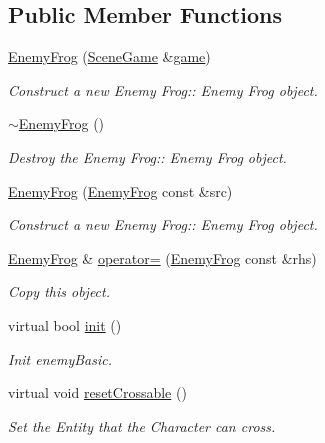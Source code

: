 \subsection*{Public Member Functions}
\begin{DoxyCompactItemize}
\item 
\hyperlink{class_enemy_frog_a2aaa60ad2669d8957e2569aa771c8714}{Enemy\+Frog} (\hyperlink{class_scene_game}{Scene\+Game} \&\hyperlink{class_a_entity_aa2c05db944a8b7487eb8470dd20211ab}{game})
\begin{DoxyCompactList}\small\item\em Construct a new Enemy Frog\+:\+: Enemy Frog object. \end{DoxyCompactList}\item 
\mbox{\label{class_enemy_frog_a3fe9f4ca463167d0bb004dadc9ea8dd2}} 
\hyperlink{class_enemy_frog_a3fe9f4ca463167d0bb004dadc9ea8dd2}{$\sim$\+Enemy\+Frog} ()
\begin{DoxyCompactList}\small\item\em Destroy the Enemy Frog\+:\+: Enemy Frog object. \end{DoxyCompactList}\item 
\hyperlink{class_enemy_frog_a5d3df45d73db5bcb2320e3a3b2e21d9a}{Enemy\+Frog} (\hyperlink{class_enemy_frog}{Enemy\+Frog} const \&src)
\begin{DoxyCompactList}\small\item\em Construct a new Enemy Frog\+:\+: Enemy Frog object. \end{DoxyCompactList}\item 
\hyperlink{class_enemy_frog}{Enemy\+Frog} \& \hyperlink{class_enemy_frog_aa92a00c282df87e83ab76c33137a6c9d}{operator=} (\hyperlink{class_enemy_frog}{Enemy\+Frog} const \&rhs)
\begin{DoxyCompactList}\small\item\em Copy this object. \end{DoxyCompactList}\item 
virtual bool \hyperlink{class_enemy_frog_adb2293192dd66ee46da359833475915b}{init} ()
\begin{DoxyCompactList}\small\item\em Init enemy\+Basic. \end{DoxyCompactList}\item 
\mbox{\label{class_enemy_frog_a868a3f7f061ecefecc366af0f882b4d2}} 
virtual void \hyperlink{class_enemy_frog_a868a3f7f061ecefecc366af0f882b4d2}{reset\+Crossable} ()
\begin{DoxyCompactList}\small\item\em Set the Entity that the Character can cross. \end{DoxyCompactList}\end{DoxyCompactItemize}
